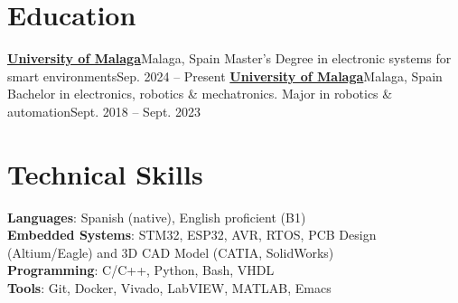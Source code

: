 \documentclass[letterpaper,11pt]{article}
\begin{document}
\section{Education}
  \resumeSubHeadingListStart
    \resumeSubheading
      {\href{}{\textbf{University of Malaga}}}{Malaga, Spain}
      {Master's Degree in electronic systems for smart environments}{Sep. 2024 -- Present}
    \resumeSubheading
      {\href{}{\textbf{University of Malaga}}}{Malaga, Spain}
      {{Bachelor in electronics, robotics \& mechatronics. Major in robotics \& automation}}{Sept. 2018 -- Sept. 2023}
  \resumeSubHeadingListEnd
    
\section{Technical Skills}
 \begin{itemize}[leftmargin=0.15in, label={}]
   \small{\item{
       \textbf{Languages}{: Spanish (native), English proficient (B1)} \\
       \textbf{Embedded Systems}{: STM32, ESP32, AVR, RTOS, PCB Design (Altium/Eagle) and 3D CAD Model (CATIA, SolidWorks)} \\
       \textbf{Programming}{: C/C++, Python, Bash, VHDL} \\
       \textbf{Tools}{: Git, Docker, Vivado, LabVIEW, MATLAB, Emacs} %
    }}
 \end{itemize}
\end{document}
